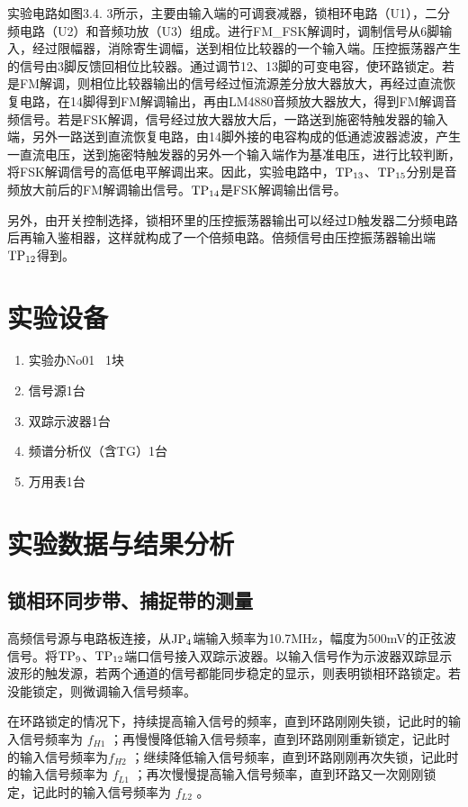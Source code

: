 \documentclass{../source/Experiment}
\begin{document}
    实验电路如图3.4. 3所示，主要由输入端的可调衰减器，锁相环电路（U1），二分频电路（U2）和音频功放（U3）组成。进行FM\_FSK解调时，调制信号从6脚输入，经过限幅器，消除寄生调幅，送到相位比较器的一个输入端。压控振荡器产生的信号由3脚反馈回相位比较器。通过调节12、13脚的可变电容，使环路锁定。若是FM解调，则相位比较器输出的信号经过恒流源差分放大器放大，再经过直流恢复电路，在14脚得到FM解调输出，再由LM4880音频放大器放大，得到FM解调音频信号。若是FSK解调，信号经过放大器放大后，一路送到施密特触发器的输入端，另外一路送到直流恢复电路，由14脚外接的电容构成的低通滤波器滤波，产生一直流电压，送到施密特触发器的另外一个输入端作为基准电压，进行比较判断，将FSK解调信号的高低电平解调出来。因此，实验电路中，$\rm TP_{13}$、$\rm TP_{15}$分别是音频放大前后的FM解调输出信号。$\rm TP_{14}$是FSK解调输出信号。

    另外，由开关控制选择，锁相环里的压控振荡器输出可以经过D触发器二分频电路后再输入鉴相器，这样就构成了一个倍频电路。倍频信号由压控振荡器输出端$ \rm TP_{12}$得到。



    \section{实验设备}
        \begin{enumerate}
            \item 实验办No01 \, 1块
            \item 信号源1台
            \item 双踪示波器1台
            \item 频谱分析仪（含TG）1台
            \item 万用表1台
        \end{enumerate}
        
    \section{实验数据与结果分析}
        \subsection{锁相环同步带、捕捉带的测量}

        高频信号源与电路板连接，从$\rm JP_4$端输入频率为10.7MHz，幅度为500mV的正弦波信号。将$\rm TP_9$、$\rm TP_{12}$端口信号接入双踪示波器。以输入信号作为示波器双踪显示波形的触发源，若两个通道的信号都能同步稳定的显示，则表明锁相环路锁定。若没能锁定，则微调输入信号频率。 

        在环路锁定的情况下，持续提高输入信号的频率，直到环路刚刚失锁，记此时的输入信号频率为 $f_{H1}$ ；再慢慢降低输入信号频率，直到环路刚刚重新锁定，记此时的输入信号频率为$f_{H2}$ ；继续降低输入信号频率，直到环路刚刚再次失锁，记此时的输入信号频率为 $f_{L1}$ ；再次慢慢提高输入信号频率，直到环路又一次刚刚锁定，记此时的输入信号频率为 $f_{L2}$ 。 
\end{document}
